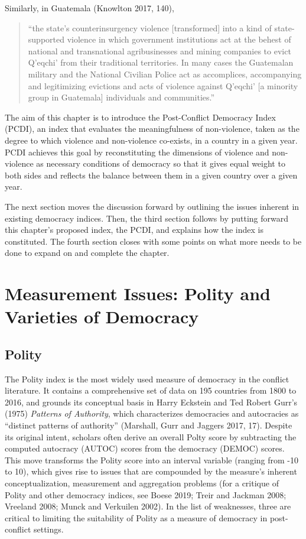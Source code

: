 \documentclass [11pt]{article}
\begin{document}
Similarly, in Guatemala (Knowlton 2017, 140),

\begin{quote}
\small
``the state’s counterinsurgency violence [transformed] into a kind of state-supported violence in which government institutions act at the behest of national and transnational agribusinesses and mining companies to evict Q’eqchi’ from their traditional territories. In many cases the Guatemalan military and the National Civilian Police act as accomplices, accompanying and legitimizing evictions and acts of violence against Q’eqchi’ [a minority group in Guatemala] individuals and communities.''
\end{quote}

The aim of this chapter is to introduce the Post-Conflict Democracy Index (PCDI), an index that evaluates the meaningfulness of non-violence, taken as the degree to which violence and non-violence co-exists, in a country in a given year. PCDI achieves this goal by reconstituting the dimensions of violence and non-violence as necessary conditions of democracy so that it gives equal weight to both sides and reflects the balance between them in a given country over a given year.

The next section moves the discussion forward by outlining the issues inherent in existing democracy indices. Then, the third section follows by putting forward this chapter's proposed index, the PCDI, and explains how the index is constituted. The fourth section closes with some points on what more needs to be done to expand on and complete the chapter.

\section*{Measurement Issues: Polity and Varieties of Democracy}

 \subsection*{Polity}

The Polity index is the most widely used measure of democracy in the conflict literature. It contains a comprehensive set of data on 195 countries from 1800 to 2016, and grounds its conceptual basis in Harry Eckstein and Ted Robert Gurr's (1975) \emph{Patterns of Authority}, which characterizes democracies and autocracies as ``distinct patterns of authority'' (Marshall, Gurr and Jaggers 2017, 17). Despite its original intent, scholars often derive an overall Polty score by subtracting the computed autocracy (AUTOC) scores from the democracy (DEMOC) scores. This move transforms the Polity score into an interval variable (ranging from -10 to 10), which gives rise to issues that are compounded by the measure's inherent conceptualization, measurement and aggregation problems (for a critique of Polity and other democracy indices, see Boese 2019; Treir and Jackman 2008; Vreeland 2008; Munck and Verkuilen 2002). In the list of weaknesses, three are critical to limiting the suitability of Polity as a measure of democracy in post-conflict settings.
\end{document}
